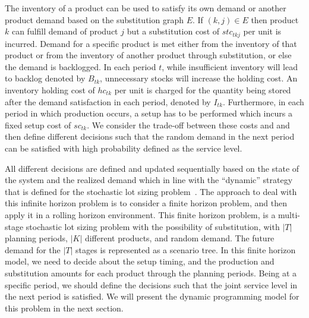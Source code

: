\documentclass[10pt]{article}
\newcommand{\ti}{t} %
\newcommand{\TI}{T}
\newcommand{\ka}{k} %
\newcommand{\KA}{K}
\newcommand{\jey}{j} %
\newcommand{\Bi}{B} %
\begin{document}
The inventory of a product can be used to satisfy its own demand or another product demand based on the substitution graph $E$. If $(k, j) \in E$ then product $\ka$  can fulfill demand of product $\jey$ but a substitution cost of $stc_{tkj}$ per unit is incurred. Demand for a specific product is met either from the inventory of that product or from the inventory of another product through substitution, or else the demand is backlogged. In each period $\ti$, while insufficient inventory will lead to backlog denoted by $\Bi_{\ti \ka}$, unnecessary stocks will increase the holding cost. An inventory holding cost of $hc_{\ti \ka}$ per unit is charged for the quantity being stored after the demand satisfaction in each period, denoted by $I_{\ti \ka}$. Furthermore, in each period in which production occurs, a setup has to be performed which incurs a fixed setup cost of $sc_{\ti \ka}$. We consider the trade-off between these costs and and then define different decisions such that the random demand in the next period can be satisfied with high probability defined as the service level. 

All different decisions are defined and updated sequentially  based on the state of the system and the realized demand which in line with the  ``dynamic'' strategy that is defined for the stochastic lot sizing problem~\cite{bookbinder1988strategies}. The approach to deal with this infinite horizon problem is to consider a finite horizon problem, and then apply it in a rolling horizon environment. This finite horizon problem, is a multi-stage stochastic lot sizing problem with the possibility of substitution, with $|\TI|$ planning periods, $|\KA|$ different products, and random demand. The future demand for the $|\TI|$ stages is represented as a scenario tree. In this finite horizon model, we need to decide about the setup timing, and the production and substitution amounts for each product through the planning periods. Being at a specific period, we should define the decisions such that the joint service level in the next period is satisfied. We will present the dynamic programming model for this problem in the next section.



\end{document}
